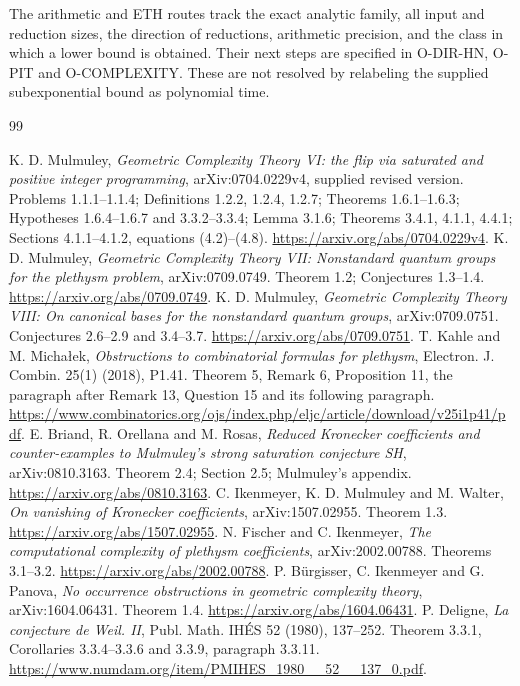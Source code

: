 \documentclass[11pt,a4paper]{article}
\begin{document}
The arithmetic and ETH routes track the exact analytic family, all input
and reduction sizes, the direction of reductions, arithmetic precision,
and the class in which a lower bound is obtained. Their next steps are
specified in O-DIR-HN, O-PIT and O-COMPLEXITY. These are not resolved by
relabeling the supplied subexponential bound as polynomial time.


\clearpage\begin{thebibliography}{99}

 K. D. Mulmuley, \emph{Geometric Complexity Theory VI: the flip via saturated and positive integer programming}, arXiv:0704.0229v4, supplied revised version. Problems 1.1.1--1.1.4; Definitions 1.2.2, 1.2.4, 1.2.7; Theorems 1.6.1--1.6.3; Hypotheses 1.6.4--1.6.7 and 3.3.2--3.3.4; Lemma 3.1.6; Theorems 3.4.1, 4.1.1, 4.4.1; Sections 4.1.1--4.1.2, equations (4.2)--(4.8). \url{https://arxiv.org/abs/0704.0229v4}.
 K. D. Mulmuley, \emph{Geometric Complexity Theory VII: Nonstandard quantum groups for the plethysm problem}, arXiv:0709.0749. Theorem 1.2; Conjectures 1.3--1.4. \url{https://arxiv.org/abs/0709.0749}.
 K. D. Mulmuley, \emph{Geometric Complexity Theory VIII: On canonical bases for the nonstandard quantum groups}, arXiv:0709.0751. Conjectures 2.6--2.9 and 3.4--3.7. \url{https://arxiv.org/abs/0709.0751}.
 T. Kahle and M. Micha\l ek, \emph{Obstructions to combinatorial formulas for plethysm}, Electron. J. Combin. 25(1) (2018), P1.41. Theorem 5, Remark 6, Proposition 11, the paragraph after Remark 13, Question 15 and its following paragraph. \url{https://www.combinatorics.org/ojs/index.php/eljc/article/download/v25i1p41/pdf}.
 E. Briand, R. Orellana and M. Rosas, \emph{Reduced Kronecker coefficients and counter-examples to Mulmuley's strong saturation conjecture SH}, arXiv:0810.3163. Theorem 2.4; Section 2.5; Mulmuley's appendix. \url{https://arxiv.org/abs/0810.3163}.
 C. Ikenmeyer, K. D. Mulmuley and M. Walter, \emph{On vanishing of Kronecker coefficients}, arXiv:1507.02955. Theorem 1.3. \url{https://arxiv.org/abs/1507.02955}.
 N. Fischer and C. Ikenmeyer, \emph{The computational complexity of plethysm coefficients}, arXiv:2002.00788. Theorems 3.1--3.2. \url{https://arxiv.org/abs/2002.00788}.
 P. B\"urgisser, C. Ikenmeyer and G. Panova, \emph{No occurrence obstructions in geometric complexity theory}, arXiv:1604.06431. Theorem 1.4. \url{https://arxiv.org/abs/1604.06431}.
 P. Deligne, \emph{La conjecture de Weil. II}, Publ. Math. IH\'ES 52 (1980), 137--252. Theorem 3.3.1, Corollaries 3.3.4--3.3.6 and 3.3.9, paragraph 3.3.11. \url{https://www.numdam.org/item/PMIHES_1980__52__137_0.pdf}.

\end{thebibliography}
\end{document}
